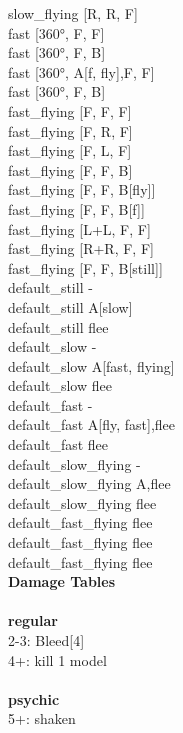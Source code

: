 slow_flying [R, R, F] \\
fast [360°, F, F] \\
fast [360°, F, B] \\
fast [360°, A[f, fly],F, F] \\
fast [360°, F, B] \\
fast_flying [F, F, F] \\
fast_flying [F, R, F] \\
fast_flying [F, L, F] \\
fast_flying [F, F, B] \\
fast_flying [F, F, B[fly]] \\
fast_flying [F, F, B[f]] \\
fast_flying [L+L, F, F] \\
fast_flying [R+R, F, F] \\
fast_flying [F, F, B[still]] \\
default_still - \\
default_still A[slow] \\
default_still flee \\
default_slow - \\
default_slow A[fast, flying] \\
default_slow flee \\
default_fast - \\
default_fast A[fly, fast],flee \\
default_fast flee \\
default_slow_flying - \\
default_slow_flying A,flee \\
default_slow_flying flee \\
default_fast_flying flee \\
default_fast_flying flee \\
default_fast_flying flee \\


{\bf Damage Tables} \\
\ \\ {\bf regular } \\
2-3: Bleed[4] \\
4+: kill 1 model \\
\ \\ {\bf psychic } \\
5+: shaken \\










